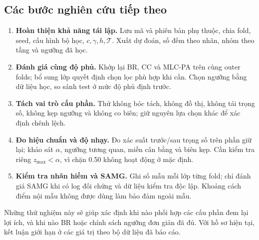 \documentclass[11pt,a4paper]{article}
\begin{document}
\subsection{Các bước nghiên cứu tiếp theo}
\begin{enumerate}
\item \textbf{Hoàn thiện khả năng tái lập.} Lưu mã và phiên bản phụ thuộc, chia fold, seed, cấu hình bộ học, $c,\gamma,h,\mathcal T$. Xuất dự đoán, số đếm theo nhãn, nhóm theo tầng và ngưỡng đã học.
\item \textbf{Đánh giá cùng độ phủ.} Khớp lại BR, CC và MLC-PA trên cùng outer folds; bổ sung lớp quyết định chọn lọc phù hợp khi cần. Chọn ngưỡng bằng dữ liệu học, so sánh test ở mức độ phủ định trước.
\item \textbf{Tách vai trò cấu phần.} Thử không bóc tách, không đồ thị, không tái trọng số, không kẹp ngưỡng và không co biên; giữ nguyên lựa chọn khác để xác định chênh lệch.
\item \textbf{Đo hiệu chuẩn và độ nhạy.} Đo xác suất trước/sau trọng số trên phần giữ lại; khảo sát $\alpha$, ngưỡng tương quan, miền cân bằng và biên kẹp. Cần kiểm tra riêng $z_{\max}<\alpha$, vì chặn 0.50 không hoạt động ở mặc định.
\item \textbf{Kiểm tra nhãn hiếm và SAMG.} Ghi số mẫu mỗi lớp từng fold; chỉ đánh giá SAMG khi có log đối chứng và dữ liệu kiểm tra độc lập. Khoảng cách điểm nội mẫu không được dùng làm bảo đảm ngoài mẫu.
\end{enumerate}
Những thử nghiệm này sẽ giúp xác định khi nào phối hợp các cấu phần đem lại lợi ích, và khi nào BR hoặc chính sách ngưỡng đơn giản đã đủ. Với hồ sơ hiện tại, kết luận giới hạn ở các giá trị theo bộ dữ liệu đã báo cáo.
\end{document}
